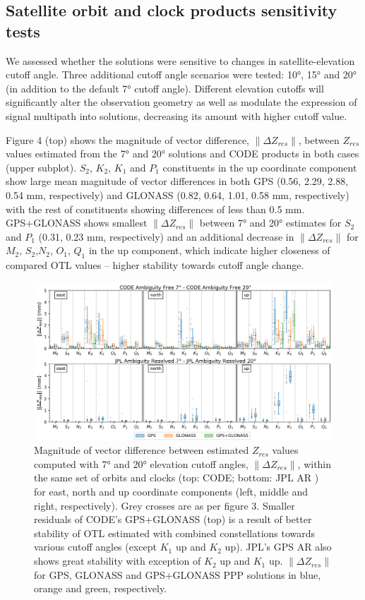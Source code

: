 \documentclass[se, manuscript]{copernicus}
\begin{document}
\subsection{Satellite orbit and clock products sensitivity tests}
We assessed whether the solutions were sensitive to changes in satellite-elevation cutoff angle. Three additional cutoff angle scenarios were tested: 10°, 15° and 20° (in addition to the default 7° cutoff angle). Different elevation cutoffs will significantly alter the observation geometry as well as modulate the expression of signal multipath into solutions, decreasing its amount with higher cutoff value.

Figure 4 (top) shows the magnitude of vector difference, $\|\Delta Z_{res}\|$, between $Z_{res}$ values estimated from the 7° and 20° solutions and CODE products in both cases (upper subplot). $S_2$, $K_2$, $K_1$ and $P_1$ constituents in the up coordinate component show large mean magnitude of vector differences in both GPS (0.56, 2.29, 2.88, 0.54 mm, respectively) and GLONASS (0.82, 0.64, 1.01, 0.58 mm, respectively) with the rest of constituents showing differences of less than 0.5 mm. GPS+GLONASS shows smallest $\|\Delta Z_{res}\|$ between 7° and 20° estimates for $S_2$ and $P_1$ (0.31, 0.23 mm, respectively) and an additional decrease in $\|\Delta Z_{res}\|$ for $M_2$, $S_2$,$N_2$, $O_1$, $Q_1$ in the up component, which indicate higher closeness of compared OTL values – higher stability towards cutoff angle change.
\begin{figure}[t]
\includegraphics[width=17cm]{fig04.png}
\caption{Magnitude of vector difference between estimated $Z_{res}$ values computed with 7° and 20° elevation cutoff angles, $\|\Delta Z_{res}\|$, within the same set of orbits and clocks (top: CODE; bottom: JPL AR ) for east, north and up coordinate components (left, middle and right, respectively). Grey crosses are as per figure 3. Smaller residuals of CODE’s GPS+GLONASS (top) is a result of better stability of OTL estimated with combined constellations towards various cutoff angles (except $K_1$ up and $K_2$ up). JPL’s GPS AR also shows great stability with exception of $K_2$ up and $K_1$ up. $\|\Delta Z_{res}\|$ for GPS, GLONASS and GPS+GLONASS PPP solutions in blue, orange and green, respectively.}
\end{figure}
\end{document}
